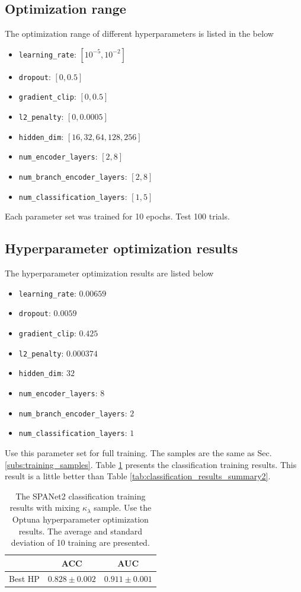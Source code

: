 \documentclass[12pt]{article}
\begin{document}
	\subsection{Optimization range}%
	\label{sub:optimization_range}
		The optimization range of different hyperparameters is listed in the below
		\begin{itemize}
			\item \verb+learning_rate+: $[10^{-5}, 10^{-2}]$ 
			\item \verb+dropout+: $[0, 0.5]$ 
			\item \verb+gradient_clip+: $[0, 0.5]$ 
			\item \verb+l2_penalty+: $[0, 0.0005]$ 
			\item \verb+hidden_dim+: $[16,32,64,128,256]$ 
			\item \verb+num_encoder_layers+: $[2,8]$ 
			\item \verb+num_branch_encoder_layers+: $[2,8]$ 
			\item \verb+num_classification_layers+: $[1,5]$ 
		\end{itemize}
		Each parameter set was trained for 10 epochs. Test 100 trials.
	\subsection{Hyperparameter optimization results}%
	\label{sub:hyperparameter_optimization_results}
		The hyperparameter optimization results are listed below
		\begin{itemize}
			\item \verb+learning_rate+: $0.00659$ 
			\item \verb+dropout+: $0.0059$ 
			\item \verb+gradient_clip+: $0.425$ 
			\item \verb+l2_penalty+: $0.000374$ 
			\item \verb+hidden_dim+: $32$ 
			\item \verb+num_encoder_layers+: $8$ 
			\item \verb+num_branch_encoder_layers+: $2$ 
			\item \verb+num_classification_layers+: $1$ 
		\end{itemize}

		Use this parameter set for full training. The samples are the same as Sec. \ref{subs:training_samples}. Table \ref{tab:SPANET_best_hp_cls_results} presents the classification training results. This result is a little better than Table \ref{tab:classification_results_summary2}.
	\begin{table}[htpb]
		\centering
		\caption{The SPANet2 classification training results with mixing $\kappa_\lambda$ sample. Use the Optuna hyperparameter optimization results. The average and standard deviation of 10 training are presented.}
		\label{tab:SPANET_best_hp_cls_results}
		\begin{tabular}{c|cc}
		& ACC     & AUC   \\ \hline
		Best HP & $0.828 \pm 0.002$ & $0.911 \pm 0.001$
		\end{tabular}      
	\end{table}
\end{document}
